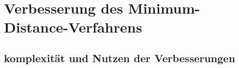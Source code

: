 \chapter{Verbesserung des Minimum-Distance-Verfahrens}





\section{komplexität und Nutzen der Verbesserungen}

